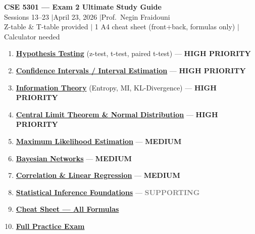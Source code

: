 \documentclass[11pt, letterpaper]{article}
\begin{document}
\begin{center}
{\LARGE\bfseries\color{accentblue} CSE 5301 --- Exam 2 Ultimate Study Guide}\\[6pt]
{\large Sessions 13--23 \quad$\vert$\quad April 23, 2026 \quad$\vert$\quad Prof.\ Negin Fraidouni}\\[4pt]
{\small Z-table \& T-table provided $\vert$ 1 A4 cheat sheet (front+back, formulas only) $\vert$ Calculator needed}
\end{center}

\vspace{6pt}

\begin{tcolorbox}[colback=lightgray, colframe=accentblue, title={\textbf{Table of Contents (by Exam Weight)}}, fonttitle=\bfseries\color{accentblue}]
\begin{enumerate}[leftmargin=*]
  \item \hyperlink{sec:hyp}{\textbf{Hypothesis Testing}} (z-test, t-test, paired t-test) --- \textcolor{warningred}{\textbf{HIGH PRIORITY}}
  \item \hyperlink{sec:ci}{\textbf{Confidence Intervals / Interval Estimation}} --- \textcolor{warningred}{\textbf{HIGH PRIORITY}}
  \item \hyperlink{sec:info}{\textbf{Information Theory}} (Entropy, MI, KL-Divergence) --- \textcolor{warningred}{\textbf{HIGH PRIORITY}}
  \item \hyperlink{sec:clt}{\textbf{Central Limit Theorem \& Normal Distribution}} --- \textcolor{warningred}{\textbf{HIGH PRIORITY}}
  \item \hyperlink{sec:mle}{\textbf{Maximum Likelihood Estimation}} --- \textcolor{orange!80!black}{\textbf{MEDIUM}}
  \item \hyperlink{sec:bayes}{\textbf{Bayesian Networks}} --- \textcolor{orange!80!black}{\textbf{MEDIUM}}
  \item \hyperlink{sec:reg}{\textbf{Correlation \& Linear Regression}} --- \textcolor{orange!80!black}{\textbf{MEDIUM}}
  \item \hyperlink{sec:stat}{\textbf{Statistical Inference Foundations}} --- \textcolor{gray}{\textbf{SUPPORTING}}
  \item \hyperlink{sec:cheat}{\textbf{Cheat Sheet --- All Formulas}}
  \item \hyperlink{sec:practice}{\textbf{Full Practice Exam}}
\end{enumerate}
\end{tcolorbox}
\end{document}
